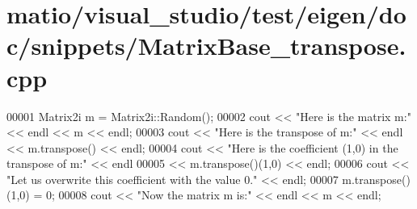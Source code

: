 \hypertarget{matio_2visual__studio_2test_2eigen_2doc_2snippets_2_matrix_base__transpose_8cpp_source}{}\section{matio/visual\+\_\+studio/test/eigen/doc/snippets/\+Matrix\+Base\+\_\+transpose.cpp}
\label{matio_2visual__studio_2test_2eigen_2doc_2snippets_2_matrix_base__transpose_8cpp_source}

\begin{DoxyCode}
00001 Matrix2i m = Matrix2i::Random();
00002 cout << \textcolor{stringliteral}{"Here is the matrix m:"} << endl << m << endl;
00003 cout << \textcolor{stringliteral}{"Here is the transpose of m:"} << endl << m.transpose() << endl;
00004 cout << \textcolor{stringliteral}{"Here is the coefficient (1,0) in the transpose of m:"} << endl
00005      << m.transpose()(1,0) << endl;
00006 cout << \textcolor{stringliteral}{"Let us overwrite this coefficient with the value 0."} << endl;
00007 m.transpose()(1,0) = 0;
00008 cout << \textcolor{stringliteral}{"Now the matrix m is:"} << endl << m << endl;
\end{DoxyCode}
